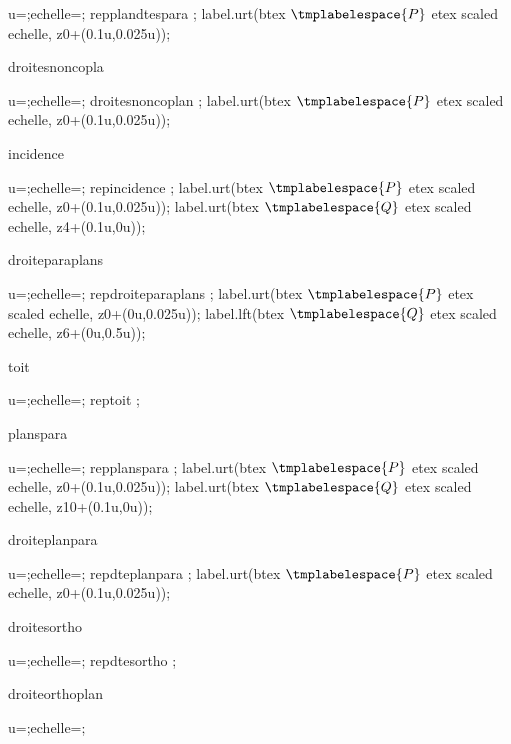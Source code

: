 {{{			\begin{mplibcode}
				u=\scaleminischemspace*1cm;echelle=\scaleminischemspace;
				repplandtespara ;
				label.urt(btex $\tmplabelespace{P}$ etex scaled echelle, z0+(0.1u,0.025u));
			\end{mplibcode}
		}%
		{droitesnoncopla}{%
			\begin{mplibcode}
				u=\scaleminischemspace*1cm;echelle=\scaleminischemspace;
				droitesnoncoplan ;
				label.urt(btex $\tmplabelespace{P}$ etex scaled echelle, z0+(0.1u,0.025u));
			\end{mplibcode}
		}%
		{incidence}{%
			\begin{mplibcode}
				u=\scaleminischemspace*1cm;echelle=\scaleminischemspace;
				repincidence ;
				label.urt(btex $\tmplabelespace{P}$ etex scaled echelle, z0+(0.1u,0.025u));
				label.urt(btex $\tmplabelespace{Q}$ etex scaled echelle, z4+(0.1u,0u));
			\end{mplibcode}
		}%
		{droiteparaplans}{%
			\begin{mplibcode}
				u=\scaleminischemspace*1cm;echelle=\scaleminischemspace;
				repdroiteparaplans ;
				label.urt(btex $\tmplabelespace{P}$ etex scaled echelle, z0+(0u,0.025u));
				label.lft(btex $\tmplabelespace{Q}$ etex scaled echelle, z6+(0u,0.5u));
			\end{mplibcode}
		}%
		{toit}{%
			\begin{mplibcode}
				u=\scaleminischemspace*1cm;echelle=\scaleminischemspace;
				reptoit ;
			\end{mplibcode}
		}%
		{planspara}{%
			\begin{mplibcode}
				u=\scaleminischemspace*1cm;echelle=\scaleminischemspace;
				repplanspara ;
				label.urt(btex $\tmplabelespace{P}$ etex scaled echelle, z0+(0.1u,0.025u));
				label.urt(btex $\tmplabelespace{Q}$ etex scaled echelle, z10+(0.1u,0u));
			\end{mplibcode}
		}%
		{droiteplanpara}{%
			\begin{mplibcode}
				u=\scaleminischemspace*1cm;echelle=\scaleminischemspace;
				repdteplanpara ;
				label.urt(btex $\tmplabelespace{P}$ etex scaled echelle, z0+(0.1u,0.025u));
			\end{mplibcode}
		}%
		{droitesortho}{%
			\begin{mplibcode}
				u=\scaleminischemspace*1cm;echelle=\scaleminischemspace;
				repdtesortho ;
			\end{mplibcode}
		}%
		{droiteorthoplan}{%
			\begin{mplibcode}
				u=\scaleminischemspace*1cm;echelle=\scaleminischemspace;

\end{mplibcode}}}}
